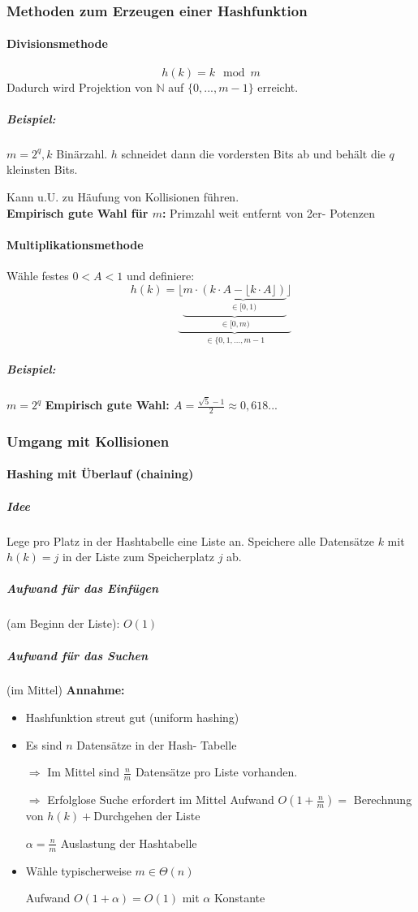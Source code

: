\documentclass[fleqn]{scrartcl}
\begin{document}
\subsubsection{Methoden zum Erzeugen einer Hashfunktion}
\paragraph{Divisionsmethode}
\[h(k) = k \mod{m}\]
Dadurch wird Projektion von $\mathbb{N}$ auf $\{0, ..., m-1\}$ erreicht.
\subparagraph{Beispiel:}
$m = 2^q, k$ Binärzahl. $h$ schneidet dann die vordersten Bits ab und behält die $q$ kleinsten Bits.

Kann u.U. zu Häufung von Kollisionen führen.\\
\textbf{Empirisch gute Wahl für $m$:} Primzahl weit entfernt von 2er- Potenzen
\paragraph{Multiplikationsmethode}
Wähle festes $0 < A < 1$ und definiere:
\[h(k) =  \underbrace{\lfloor \underbrace{m \cdot \underbrace{(k\cdot A - \lfloor k \cdot A \rfloor)}_{\in [0, 1)}}_{\in [0, m)}\rfloor}_{\in \{0, 1, ..., m-1} \]

\subparagraph{Beispiel:}
$m = 2^q$  
\textbf{Empirisch gute Wahl: $A= \frac{\sqrt{5}-1}{2} \approx 0,618...$ } 

\subsubsection{Umgang mit Kollisionen}
\paragraph{Hashing mit Überlauf (\glqq chaining\grqq)}
\subparagraph{Idee}Lege pro Platz in der Hashtabelle eine Liste an. Speichere alle Datensätze $k$ mit $h(k) = j$ in der Liste zum Speicherplatz $j$ ab.
\subparagraph{Aufwand für das Einfügen} (am Beginn der Liste): $O(1)$
\subparagraph{Aufwand für das Suchen} (im Mittel)
\textbf{Annahme:} \begin{itemize}
\item Hashfunktion streut gut (uniform hashing)
\item Es sind $n$ Datensätze in der Hash- Tabelle
\item[$\Rightarrow$] Im Mittel sind $\frac{n}{m}$ Datensätze pro Liste vorhanden.
\item[$\Rightarrow$] Erfolglose Suche erfordert im Mittel Aufwand $O(1 + \frac{n}{m}) = $ Berechnung von $h(k) + $Durchgehen der Liste

$\alpha = \frac{n}{m}$ Auslastung der Hashtabelle
\item Wähle typischerweise $m \in \Theta(n)$

Aufwand $O(1 + \alpha) = O(1)$ mit $\alpha$ Konstante
\end{itemize}
\end{document}
